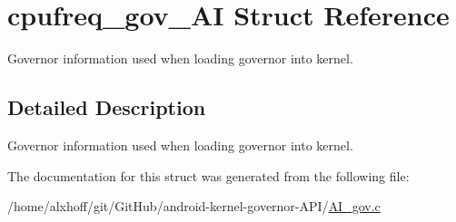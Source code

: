 \hypertarget{structcpufreq__gov__AI}{}\section{cpufreq\+\_\+gov\+\_\+\+AI Struct Reference}
\label{structcpufreq__gov__AI}


Governor information used when loading governor into kernel.  




\subsection{Detailed Description}
Governor information used when loading governor into kernel. 

The documentation for this struct was generated from the following file\+:\begin{DoxyCompactItemize}
\item 
/home/alxhoff/git/\+Git\+Hub/android-\/kernel-\/governor-\/\+A\+P\+I/\hyperlink{AI__gov_8c}{A\+I\+\_\+gov.\+c}\end{DoxyCompactItemize}

